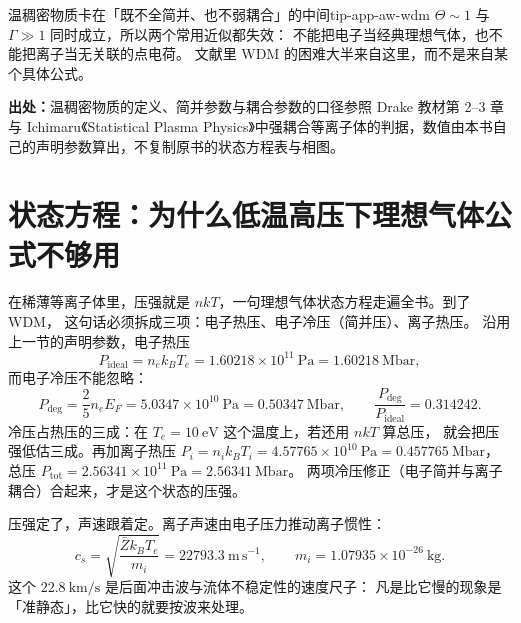 \begin{tip}{温稠密物质卡在「既不全简并、也不弱耦合」的中间}{tip-app-aw-wdm}
$\Theta\sim1$ 与 $\Gamma\gg1$ 同时成立，所以两个常用近似都失效：
不能把电子当经典理想气体，也不能把离子当无关联的点电荷。
文献里 WDM 的困难大半来自这里，而不是来自某个具体公式。
\end{tip}

{\footnotesize
\textbf{出处：}温稠密物质的定义、简并参数与耦合参数的口径参照 Drake 教材第 2--3 章
与 Ichimaru《Statistical Plasma Physics》中强耦合等离子体的判据，数值由本书自己的声明参数算出，不复制原书的状态方程表与相图。
}

\section{状态方程：为什么低温高压下理想气体公式不够用}
\label{sec:app-aw-eos}

在稀薄等离子体里，压强就是 $nkT$，一句理想气体状态方程走遍全书。到了 WDM，
这句话必须拆成三项：电子热压、电子冷压（简并压）、离子热压。
沿用上一节的声明参数，电子热压
\begin{equation}
P_\mathrm{ideal}=n_ek_BT_e=1.60218\times10^{11}\ \mathrm{Pa}=1.60218\ \mathrm{Mbar},
\label{eq:app-aw-ideal}
\end{equation}
而电子冷压不能忽略：
\begin{equation}
P_\mathrm{deg}=\frac{2}{5}n_eE_F
=5.0347\times10^{10}\ \mathrm{Pa}=0.50347\ \mathrm{Mbar},
\qquad
\frac{P_\mathrm{deg}}{P_\mathrm{ideal}}=0.314242.
\label{eq:app-aw-deg}
\end{equation}
冷压占热压的三成：在 $T_e=10\ \mathrm{eV}$ 这个温度上，若还用 $nkT$ 算总压，
就会把压强低估三成。再加离子热压
$P_i=n_ik_BT_i=4.57765\times10^{10}\ \mathrm{Pa}=0.457765\ \mathrm{Mbar}$，
总压 $P_\mathrm{tot}=2.56341\times10^{11}\ \mathrm{Pa}=2.56341\ \mathrm{Mbar}$。
两项冷压修正（电子简并与离子耦合）合起来，才是这个状态的压强。

压强定了，声速跟着定。离子声速由电子压力推动离子惯性：
\begin{equation}
c_s=\sqrt{\frac{\bar Zk_BT_e}{m_i}}=22793.3\ \mathrm{m\,s^{-1}},
\qquad m_i=1.07935\times10^{-26}\ \mathrm{kg}.
\label{eq:app-aw-cs}
\end{equation}
这个 $22.8\ \mathrm{km/s}$ 是后面冲击波与流体不稳定性的速度尺子：
凡是比它慢的现象是「准静态」，比它快的就要按波来处理。

